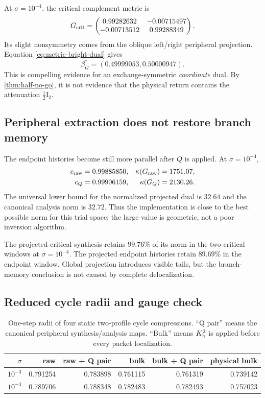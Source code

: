 \documentclass[11pt]{article}
\theoremstyle{definition}
\theoremstyle{remark}
\newcommand{\Id}{\mathrm I}
\begin{document}
At $\sigma=10^{-4}$, the critical complement metric is
\begin{equation}\label{eq:critical-metric-smallest}
 G_{\rm crit}=
 \begin{pmatrix}
 0.99282632&-0.00715497\\
 -0.00713512&0.99288349
 \end{pmatrix}.
\end{equation}
Its slight nonsymmetry comes from the oblique left/right peripheral
projection.  Equation \eqref{eq:metric-bright-dual} gives
\begin{equation}\label{eq:critical-bright-dual-smallest}
 \beta_G^*=(0.49999053,0.50000947).
\end{equation}
This is compelling evidence for an exchange-symmetric \emph{coordinate}
dual.  By \cref{thm:half-no-go}, it is not evidence that the physical return
contains the attenuation $\frac12\Id_2$.

\subsection{Peripheral extraction does not restore branch memory}

The endpoint histories become still more parallel after $Q$ is applied.  At
$\sigma=10^{-4}$,
\begin{align}
 c_{\rm raw}&=0.99885850,
 &\kappa(G_{\rm raw})&=1751.07,
 \label{eq:raw-memory-smallest}\\
 c_Q&=0.99906159,
 &\kappa(G_Q)&=2130.26.
 \label{eq:q-memory-smallest}
\end{align}
The universal lower bound for the normalized projected dual is $32.64$ and
the canonical analysis norm is $32.72$.  Thus the implementation is close to
the best possible norm for this trial space; the large value is geometric,
not a poor inversion algorithm.

The projected critical synthesis retains $99.76\%$ of its norm in the two
critical windows at $\sigma=10^{-4}$.  The projected endpoint histories
retain $89.69\%$ in the endpoint window.  Global projection introduces
visible tails, but the branch-memory conclusion is not caused by complete
delocalization.

\subsection{Reduced cycle radii and gauge check}

\begin{table}[H]
\centering
\small
\caption{One-step radii of four static two-profile cycle compressions.  ``Q
pair'' means the canonical peripheral synthesis/analysis maps.  ``Bulk''
means $K_{\rm b}^2$ is applied before every packet localization.}
\label{tab:cycle-radii}
\begin{tabular}{rrrrrr}
\toprule
$\sigma$ & raw & raw + Q pair & bulk & bulk + Q pair & physical bulk\\
\midrule
$10^{-3}$&0.791254&0.783898&0.761115&0.761319&0.739142\\
$10^{-4}$&0.789706&0.788348&0.782483&0.782493&0.757023\\
\bottomrule
\end{tabular}
\end{table}
\end{document}
